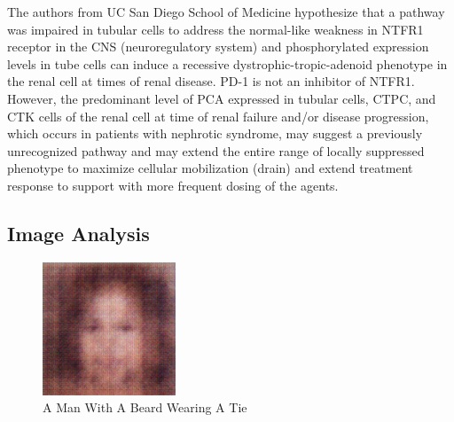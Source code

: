 \documentclass{article}%
\begin{document}
The authors from UC San Diego School of Medicine hypothesize that a pathway was impaired in tubular cells to address the normal{-}like weakness in NTFR1 receptor in the CNS (neuroregulatory system) and phosphorylated expression levels in tube cells can induce a recessive dystrophic{-}tropic{-}adenoid phenotype in the renal cell at times of renal disease. PD{-}1 is not an inhibitor of NTFR1. However, the predominant level of PCA expressed in tubular cells, CTPC, and CTK cells of the renal cell at time of renal failure and/or disease progression, which occurs in patients with nephrotic syndrome, may suggest a previously unrecognized pathway and may extend the entire range of locally suppressed phenotype to maximize cellular mobilization (drain) and extend treatment response to support with more frequent dosing of the agents.

%
\subsection{Image Analysis}%
\label{subsec:ImageAnalysis}%


\begin{figure}[h!]%
\centering%
\includegraphics[width=150px]{500_fake_images/samples_5_436.png}%
\caption{A Man With A Beard Wearing A Tie}%
\end{figure}

%
\end{document}
